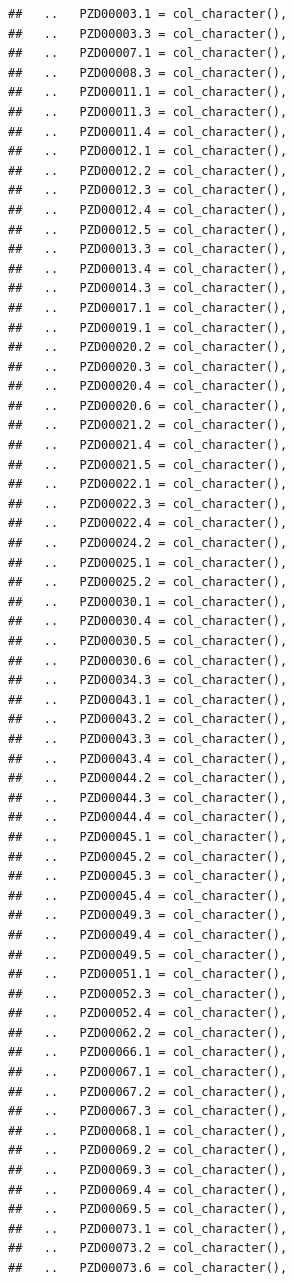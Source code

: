 \documentclass[
]{article}
\begin{document}
\begin{verbatim}
##   ..   PZD00003.1 = col_character(),
##   ..   PZD00003.3 = col_character(),
##   ..   PZD00007.1 = col_character(),
##   ..   PZD00008.3 = col_character(),
##   ..   PZD00011.1 = col_character(),
##   ..   PZD00011.3 = col_character(),
##   ..   PZD00011.4 = col_character(),
##   ..   PZD00012.1 = col_character(),
##   ..   PZD00012.2 = col_character(),
##   ..   PZD00012.3 = col_character(),
##   ..   PZD00012.4 = col_character(),
##   ..   PZD00012.5 = col_character(),
##   ..   PZD00013.3 = col_character(),
##   ..   PZD00013.4 = col_character(),
##   ..   PZD00014.3 = col_character(),
##   ..   PZD00017.1 = col_character(),
##   ..   PZD00019.1 = col_character(),
##   ..   PZD00020.2 = col_character(),
##   ..   PZD00020.3 = col_character(),
##   ..   PZD00020.4 = col_character(),
##   ..   PZD00020.6 = col_character(),
##   ..   PZD00021.2 = col_character(),
##   ..   PZD00021.4 = col_character(),
##   ..   PZD00021.5 = col_character(),
##   ..   PZD00022.1 = col_character(),
##   ..   PZD00022.3 = col_character(),
##   ..   PZD00022.4 = col_character(),
##   ..   PZD00024.2 = col_character(),
##   ..   PZD00025.1 = col_character(),
##   ..   PZD00025.2 = col_character(),
##   ..   PZD00030.1 = col_character(),
##   ..   PZD00030.4 = col_character(),
##   ..   PZD00030.5 = col_character(),
##   ..   PZD00030.6 = col_character(),
##   ..   PZD00034.3 = col_character(),
##   ..   PZD00043.1 = col_character(),
##   ..   PZD00043.2 = col_character(),
##   ..   PZD00043.3 = col_character(),
##   ..   PZD00043.4 = col_character(),
##   ..   PZD00044.2 = col_character(),
##   ..   PZD00044.3 = col_character(),
##   ..   PZD00044.4 = col_character(),
##   ..   PZD00045.1 = col_character(),
##   ..   PZD00045.2 = col_character(),
##   ..   PZD00045.3 = col_character(),
##   ..   PZD00045.4 = col_character(),
##   ..   PZD00049.3 = col_character(),
##   ..   PZD00049.4 = col_character(),
##   ..   PZD00049.5 = col_character(),
##   ..   PZD00051.1 = col_character(),
##   ..   PZD00052.3 = col_character(),
##   ..   PZD00052.4 = col_character(),
##   ..   PZD00062.2 = col_character(),
##   ..   PZD00066.1 = col_character(),
##   ..   PZD00067.1 = col_character(),
##   ..   PZD00067.2 = col_character(),
##   ..   PZD00067.3 = col_character(),
##   ..   PZD00068.1 = col_character(),
##   ..   PZD00069.2 = col_character(),
##   ..   PZD00069.3 = col_character(),
##   ..   PZD00069.4 = col_character(),
##   ..   PZD00069.5 = col_character(),
##   ..   PZD00073.1 = col_character(),
##   ..   PZD00073.2 = col_character(),
##   ..   PZD00073.6 = col_character(),

\end{verbatim}
\end{document}
